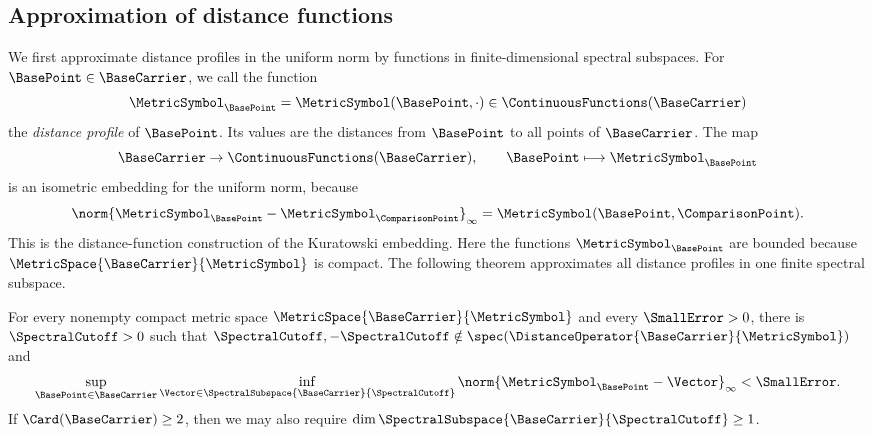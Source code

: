 \subsection{Approximation of distance functions}\label{subsec:spectral-distance-approximation}
We first approximate distance profiles in the uniform norm by functions in
finite-dimensional spectral subspaces.
For
$\BasePoint\in\BaseCarrier$,
we call the function
\[
 \MetricSymbol_\BasePoint=\MetricSymbol(\BasePoint,\cdot)
 \in\ContinuousFunctions(\BaseCarrier)
\]
the \emph{distance profile} of
$\BasePoint$.
Its values are the distances from
$\BasePoint$
to all points of
$\BaseCarrier$.
The map
\[
 \BaseCarrier\to\ContinuousFunctions(\BaseCarrier),
 \qquad\BasePoint\longmapsto\MetricSymbol_\BasePoint
\]
is an isometric embedding for the uniform norm,
because
\[
 \norm{\MetricSymbol_\BasePoint-\MetricSymbol_\ComparisonPoint}_\infty
 =\MetricSymbol(\BasePoint,\ComparisonPoint).
\]
This is the distance-function construction of the Kuratowski embedding.
Here the functions
$\MetricSymbol_\BasePoint$
are bounded because
$\MetricSpace{\BaseCarrier}{\MetricSymbol}$
is compact.
The following theorem approximates all distance profiles in one finite
spectral subspace.

\begin{theorem}\label{lem:spectral-density}
For every nonempty compact metric space
$\MetricSpace{\BaseCarrier }{\MetricSymbol }$
and every
$\SmallError >0$,
there is
$\SpectralCutoff >0$
such that
$\SpectralCutoff ,-\SpectralCutoff \notin\spec(\DistanceOperator{\BaseCarrier}{\MetricSymbol})$
and
\begin{equation}\label{eq:spectral-uniform-approximation}
 \sup_{\BasePoint \in \BaseCarrier }\inf_{\Vector \in\SpectralSubspace{\BaseCarrier }{\SpectralCutoff }}
          \norm{\MetricSymbol _\BasePoint -\Vector }_\infty<\SmallError .
\end{equation}
If $\Card(\BaseCarrier)\geq2$,
then we may also require
$\dim\SpectralSubspace{\BaseCarrier }{\SpectralCutoff }\geq1$.
\end{theorem}

